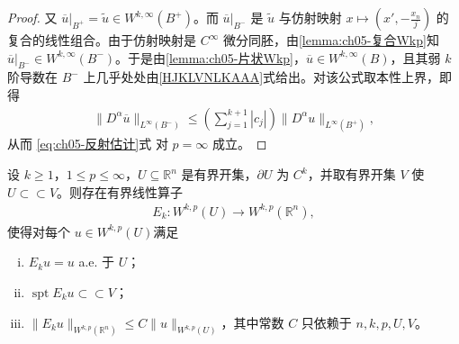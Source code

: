 \documentclass[../../main.tex]{subfiles}
\begin{document}
\begin{proof}
又 $\overline{u}|_{B^{+}}=\widetilde{u}\in W^{k,\infty}(B^{+})$。而 $\overline{u}|_{B^{-}}$ 是 $\widetilde{u}$ 与仿射映射 $x\mapsto\left(x',-\frac{x_n}{j}\right)$ 的复合的线性组合。由于仿射映射是 $C^{\infty}$ 微分同胚，由\cref{lemma:ch05-复合Wkp}知 $\overline{u}|_{B^{-}}\in W^{k,\infty}(B^{-})$。于是由\cref{lemma:ch05-片状Wkp}，$\overline{u}\in W^{k,\infty}(B)$，且其弱 $k$ 阶导数在 $B^{-}$ 上几乎处处由\eqref{HJKLVNLKAAA}式给出。对该公式取本性上界，即得
\begin{align*}
\|D^{\alpha}\overline{u}\|_{L^{\infty}(B^{-})}
\leqslant\left(\sum_{j=1}^{k+1}|c_j|\right)\|D^{\alpha}u\|_{L^{\infty}(B^{+})},
\end{align*}
从而 \eqref{eq:ch05-反射估计}式 对 $p=\infty$ 成立。
\end{proof}

\begin{theorem}[扩张定理]\label{theorem:ch05-扩张定理}
设 $k\geqslant1$，$1\leqslant p\leqslant\infty$，$U\subseteq\mathbb{R}^{n}$ 是有界开集，$\partial U$ 为 $C^{k}$，并取有界开集 $V$ 使 $U\subset\subset V$。则存在有界线性算子
\begin{align*}
E_k:W^{k,p}(U)\to W^{k,p}(\mathbb{R}^{n}),
\end{align*}
使得对每个 $u\in W^{k,p}(U)$满足
\begin{enumerate}[(i)]
\item $E_ku=u$ a.e. 于 $U$；
\item $\operatorname{spt}E_ku\subset\subset V$；
\item $\|E_ku\|_{W^{k,p}(\mathbb{R}^{n})}\leqslant C\|u\|_{W^{k,p}(U)}$，其中常数 $C$ 只依赖于 $n,k,p,U,V$。
\end{enumerate}
\end{theorem}
\end{document}
